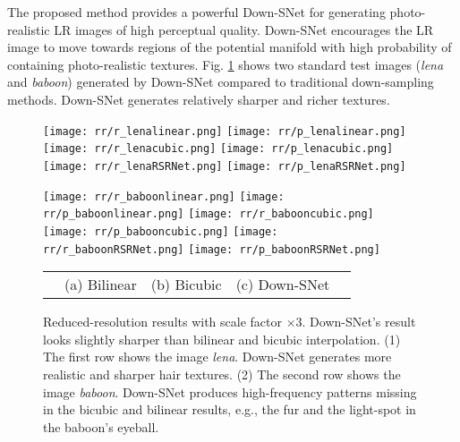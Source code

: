 \documentclass[runningheads]{llncs}
\begin{document}
The proposed method provides a powerful Down-SNet for generating photo-realistic LR images of high perceptual quality. Down-SNet encourages the LR image to move towards regions of the potential manifold with high probability of containing photo-realistic textures. Fig. \ref{fig:rrnet} shows two standard test images (\emph{lena} and \emph{baboon}) generated by Down-SNet compared to traditional down-sampling methods. Down-SNet generates relatively sharper and richer textures.
\begin{figure}[h]
\begin{center}
\texttt{[image: rr/r\_lenalinear.png]}
\texttt{[image: rr/p\_lenalinear.png]}
\texttt{[image: rr/r\_lenacubic.png]}
\texttt{[image: rr/p\_lenacubic.png]}
\texttt{[image: rr/r\_lenaRSRNet.png]}
\texttt{[image: rr/p\_lenaRSRNet.png]}

\texttt{[image: rr/r\_baboonlinear.png]}
\texttt{[image: rr/p\_baboonlinear.png]}
\texttt{[image: rr/r\_babooncubic.png]}
\texttt{[image: rr/p\_babooncubic.png]}
\texttt{[image: rr/r\_baboonRSRNet.png]}
\texttt{[image: rr/p\_baboonRSRNet.png]}
\begin{tabular}{cC{3.3cm}C{3.3cm}C{3.3cm}c}
&(a) Bilinear&(b) Bicubic&(c) Down-SNet&
\end{tabular}
\end{center}
   \caption{Reduced-resolution results with scale factor $\times 3$. Down-SNet's result looks slightly sharper than bilinear and bicubic interpolation. (1) The first row shows the image \emph{lena}. Down-SNet generates more realistic and sharper hair textures. (2) The second row shows the image \emph{baboon}. Down-SNet produces high-frequency patterns missing in the bicubic and bilinear results, e.g., the fur and the light-spot in the baboon's eyeball.}
\label{fig:rrnet}
\end{figure}
\end{document}
